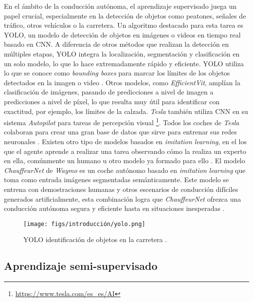 En el ámbito de la conducción autónoma, el aprendizaje supervisado juega un papel crucial, especialmente en la detección de objetos como peatones, señales de tráfico, otros vehículos o la carretera. Un algoritmo destacado para esta tarea es \ac{YOLO}, un modelo de detección de objetos en imágenes o videos en tiempo real basado en \ac{CNN}. A diferencia de otros métodos que realizan la detección en múltiples etapas, \ac{YOLO} integra la localización, segmentación y clasificación en un solo modelo, lo que lo hace extremadamente rápido y eficiente. \ac{YOLO} utiliza lo que se conoce como \textit{bounding boxes} para marcar los límites de los objetos detectados en la imagen o video \cite{yolo}. Otros modelos, como \textit{EfficientVit}, amplían la clasificación de imágenes, pasando de predicciones a nivel de imagen a predicciones a nivel de píxel, lo que resulta muy útil para identificar con exactitud, por ejemplo, los límites de la calzada. \textit{Tesla} también utiliza \ac{CNN} en su sistema \textit{Autopilot} para tareas de percepción visual \footnote{\url{https://www.tesla.com/es_es/AI}}. Todos los coches de \textit{Tesla} colaboran para crear una gran base de datos que sirve para entrenar sus redes neuronales \cite{tesla-dataset}. Existen otro tipo de modelos basados en \textit{imitation learning}, en el los que el agente aprende a realizar una tarea observando cómo la realiza un experto en ella, comúnmente un humano u otro modelo ya formado para ello \cite{imitation-learning}. El modelo \textit{ChauffeurNet} de \textit{Waymo} es un coche autónomo basado en \textit{imitation learning} que toma como entrada imágenes segmentadas semánticamente. Este modelo se entrena con demostraciones humanas y otros escenarios de conducción difíciles generados artificialmente, esta combinación logra que \textit{ChauffeurNet} ofrezca una conducción autónoma segura y eficiente hasta en situaciones inesperadas \cite{chauffeurnet-paper}.

\begin{figure}[ht]
\begin{center}
\texttt{[image: figs/introducción/yolo.png]}
\end{center}
\caption{YOLO identificación de objetos en la carretera \cite{yolo-detection}.}
\label{yolo}
\end{figure}

\subsection{Aprendizaje semi-supervisado}


